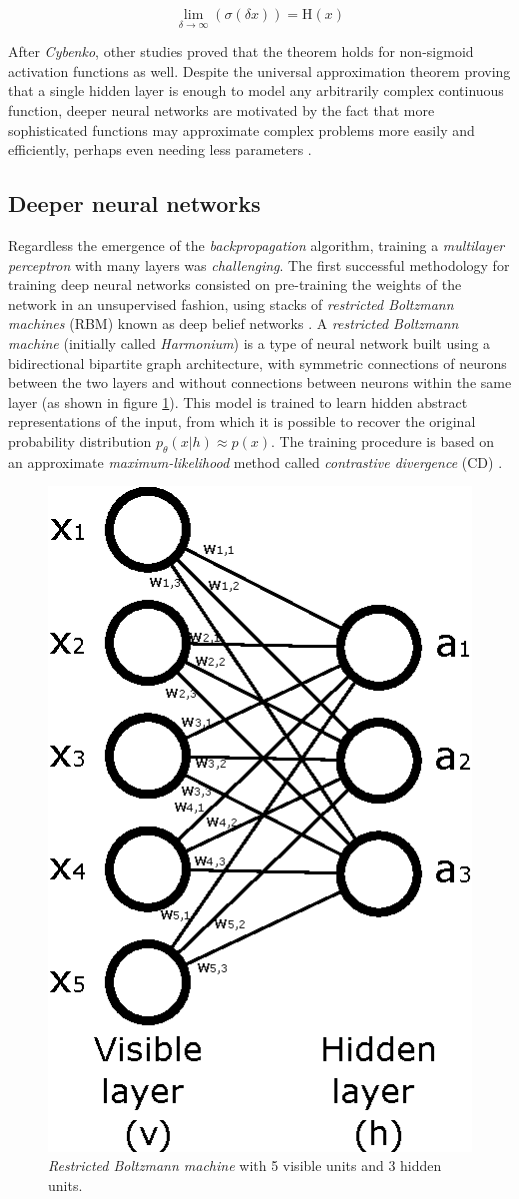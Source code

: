 \begin{equation}
	\label{eq:sigmoidToHeavyside}
	\lim_{\delta \rightarrow \infty} (\sigma(\delta x)) = \mathrm{H}(x)
\end{equation}



After \textit{Cybenko}, other studies \autocite{Leshno1993, pinkus1999} proved that the theorem holds for non-sigmoid activation functions as well. Despite the universal approximation theorem proving that a single hidden layer is enough to model any arbitrarily complex continuous function, deeper neural networks are motivated by the fact that more sophisticated functions may approximate complex problems more easily and efficiently, perhaps even needing less parameters \autocite{nguyen21}.



\subsection{Deeper neural networks} \label{sec:deepernn}
Regardless the emergence of the \textit{backpropagation} algorithm, training a \textit{multilayer perceptron} with many layers was \textit{challenging}. The first successful methodology for training deep neural networks consisted on pre-training the weights of the network in an unsupervised fashion, using stacks of \textit{restricted Boltzmann machines} (RBM) \autocite{Smolensky1986} known as deep belief networks \autocite{hinton2006, Bengio2007}. A \textit{restricted Boltzmann machine} (initially called \textit{Harmonium}) is a type of neural network built using a bidirectional bipartite graph architecture, with symmetric connections of neurons between the two layers and without connections between neurons within the same layer (as shown in figure \ref{fig:rbm}). This model is trained to learn hidden abstract representations of the input, from which it is possible to recover the original probability distribution $p_\theta(x|h) \approx p(x)$. The training procedure is based on an approximate \textit{maximum-likelihood} method called \textit{contrastive divergence} (CD) \autocite{hinton2002}.

\begin{figure}[h!]
	\centering
	\includegraphics[width=0.3\linewidth]{background/images/rbm}
	\caption[\textit{Restricted Boltzmann machine}]{\textit{Restricted Boltzmann machine} with 5 visible units and 3 hidden units.}
	\label{fig:rbm}
\end{figure}

